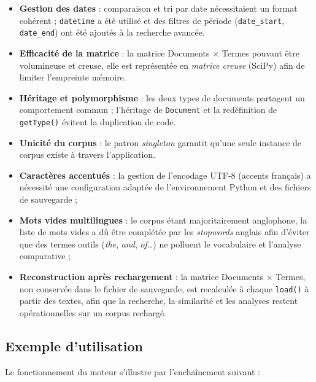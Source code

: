 \documentclass[12pt,a4paper]{article}
\begin{document}
\begin{itemize}
    \item \textbf{Gestion des dates} : comparaison et tri par date nécessitaient un format cohérent ; \texttt{datetime} a été utilisé et des filtres de période (\texttt{date\_start}, \texttt{date\_end}) ont été ajoutés à la recherche avancée.
    \item \textbf{Efficacité de la matrice} : la matrice Documents $\times$ Termes pouvant être volumineuse et creuse, elle est représentée en \emph{matrice creuse} (SciPy) afin de limiter l'empreinte mémoire.
    \item \textbf{Héritage et polymorphisme} : les deux types de documents partagent un comportement commun ; l'héritage de \texttt{Document} et la redéfinition de \texttt{getType()} évitent la duplication de code.
    \item \textbf{Unicité du corpus} : le patron \emph{singleton} garantit qu'une seule instance de corpus existe à travers l'application.
    \item \textbf{Caractères accentués} : la gestion de l'encodage UTF-8 (accents français) a nécessité une configuration adaptée de l'environnement Python et des fichiers de sauvegarde ;
    \item \textbf{Mots vides multilingues} : le corpus étant majoritairement anglophone, la liste de mots vides a dû être complétée par les \emph{stopwords} anglais afin d'éviter que des termes outils (\emph{the}, \emph{and}, \emph{of}\ldots) ne polluent le vocabulaire et l'analyse comparative ;
    \item \textbf{Reconstruction après rechargement} : la matrice Documents $\times$ Termes, non conservée dans le fichier de sauvegarde, est recalculée à chaque \texttt{load()} à partir des textes, afin que la recherche, la similarité et les analyses restent opérationnelles sur un corpus rechargé.
\end{itemize}

\subsection{Exemple d'utilisation}

Le fonctionnement du moteur s'illustre par l'enchaînement suivant :
\end{document}
